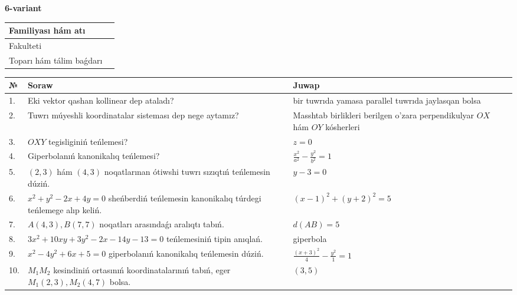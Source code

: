 \documentclass{article}
\begin{document}
\egroup

\newpage


\textbf{6-variant}\\

\bgroup
\def\arraystretch{1.6} %

\begin{tabular}{|m{5.7cm}|m{9.5cm}|}
\hline
Familiyası hám atı & \\
\hline
Fakulteti  & \\
\hline
Toparı hám tálim baǵdarı  & \\
\hline
\end{tabular}

\vspace{1cm}

\begin{tabular}{|m{0.7cm}|m{10cm}|m{4cm}|}
\hline
№ & Soraw & Juwap \\
\hline
1. & Eki vektor qashan kollinear dep ataladı? & bir tuwrıda yamasa parallel tuwrıda jaylasqan bolsa \\
\hline
2. & Tuwrı múyeshli koordinatalar sisteması dep nege aytamız? & Masshtab birlikleri berilgen o'zara perpendikulyar $OX$ hám $OY$ kósherleri \\
\hline
3. & $OXY$ tegisliginiń teńlemesi? & $z=0$ \\
\hline
4. & Giperbolanıń kanonikalıq teńlemesi? & $\frac{x^2}{a^2}-\frac{y^2}{b^2}=1$ \\
\hline
5. & $(2, 3)$ hám $(4, 3)$ noqatlarınan ótiwshi tuwrı sızıqtıń teńlemesin dúziń. & $ y-3=0$ \\
\hline
6. & $x^{2}+y^{2}-2x+4y=0$ sheńberdiń teńlemesin kanonikalıq túrdegi teńlemege alıp keliń. & $(x-1)^{2}+(y+2)^{2}=5$ \\
\hline
7. & $A(4, 3), B(7, 7)$ noqatları arasındaǵı aralıqtı tabıń. & $d(AB)=5$ \\
\hline
8. & $3x^{2}+10xy+3y^{2}-2x-14y-13=0$ teńlemesiniń tipin anıqlań. & giperbola \\
\hline
9. & $x^{2}-4y^{2}+6x+5=0$ giperbolanıń kanonikalıq teńlemesin dúziń. & $\frac{(x+3)^{2}}{4}-\frac{y^{2}}{1}=1$ \\
\hline
10. & $M_{1}M_{2}$ kesindiniń ortasınıń koordinatalarınıń tabıń, eger $M_{1} (2, 3), M_{2} (4, 7)$ bolsa. & $(3,5)$ \\
\hline
\end{tabular}

\vspace{1cm}
\end{document}
